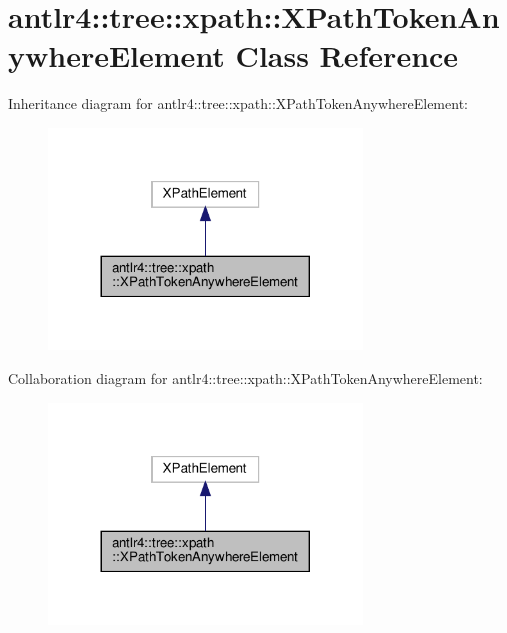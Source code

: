 \hypertarget{classantlr4_1_1tree_1_1xpath_1_1XPathTokenAnywhereElement}{}\section{antlr4\+:\+:tree\+:\+:xpath\+:\+:X\+Path\+Token\+Anywhere\+Element Class Reference}
\label{classantlr4_1_1tree_1_1xpath_1_1XPathTokenAnywhereElement}


Inheritance diagram for antlr4\+:\+:tree\+:\+:xpath\+:\+:X\+Path\+Token\+Anywhere\+Element\+:
\nopagebreak
\begin{figure}[H]
\begin{center}
\leavevmode
\includegraphics[width=236pt]{classantlr4_1_1tree_1_1xpath_1_1XPathTokenAnywhereElement__inherit__graph}
\end{center}
\end{figure}


Collaboration diagram for antlr4\+:\+:tree\+:\+:xpath\+:\+:X\+Path\+Token\+Anywhere\+Element\+:
\nopagebreak
\begin{figure}[H]
\begin{center}
\leavevmode
\includegraphics[width=236pt]{classantlr4_1_1tree_1_1xpath_1_1XPathTokenAnywhereElement__coll__graph}
\end{center}
\end{figure}
